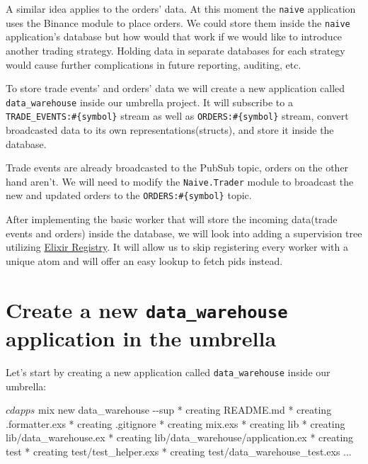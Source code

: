 \documentclass[
  oneside]{book}
\newenvironment{Shaded}{\begin{snugshade}}{\end{snugshade}}
\newcommand{\AttributeTok}[1]{\textcolor[rgb]{0.77,0.63,0.00}{#1}}
\newcommand{\ExtensionTok}[1]{#1}
\newcommand{\NormalTok}[1]{#1}
\begin{document}
A similar idea applies to the orders' data. At this moment the \texttt{naive} application uses the Binance module to place orders. We could store them inside the \texttt{naive} application's database but how would that work if we would like to introduce another trading strategy. Holding data in separate databases for each strategy would cause further complications in future reporting, auditing, etc.

To store trade events' and orders' data we will create a new application called \texttt{data\_warehouse} inside our umbrella project. It will subscribe to a \texttt{TRADE\_EVENTS:\#\{symbol\}} stream as well as \texttt{ORDERS:\#\{symbol\}} stream, convert broadcasted data to its own representations(structs), and store it inside the database.

Trade events are already broadcasted to the PubSub topic, orders on the other hand aren't. We will need to modify the \texttt{Naive.Trader} module to broadcast the new and updated orders to the \texttt{ORDERS:\#\{symbol\}} topic.

After implementing the basic worker that will store the incoming data(trade events and orders) inside the database, we will look into adding a supervision tree utilizing \href{https://hexdocs.pm/elixir/master/Registry.html}{Elixir Registry}. It will allow us to skip registering every worker with a unique atom and will offer an easy lookup to fetch pids instead.

\hypertarget{create-a-new-data_warehouse-application-in-the-umbrella}{%
\section{\texorpdfstring{Create a new \texttt{data\_warehouse} application in the umbrella}{Create a new data\_warehouse application in the umbrella}}\label{create-a-new-data_warehouse-application-in-the-umbrella}}

Let's start by creating a new application called \texttt{data\_warehouse} inside our umbrella:

\begin{Shaded}
\begin{Highlighting}[]
\ExtensionTok{$}\NormalTok{ cd apps}
\ExtensionTok{$}\NormalTok{ mix new data\_warehouse }\AttributeTok{{-}{-}sup}
\ExtensionTok{*}\NormalTok{ creating README.md}
\ExtensionTok{*}\NormalTok{ creating .formatter.exs}
\ExtensionTok{*}\NormalTok{ creating .gitignore}
\ExtensionTok{*}\NormalTok{ creating mix.exs}
\ExtensionTok{*}\NormalTok{ creating lib}
\ExtensionTok{*}\NormalTok{ creating lib/data\_warehouse.ex}
\ExtensionTok{*}\NormalTok{ creating lib/data\_warehouse/application.ex}
\ExtensionTok{*}\NormalTok{ creating test}
\ExtensionTok{*}\NormalTok{ creating test/test\_helper.exs}
\ExtensionTok{*}\NormalTok{ creating test/data\_warehouse\_test.exs}
\ExtensionTok{...}
\end{Highlighting}
\end{Shaded}
\end{document}
